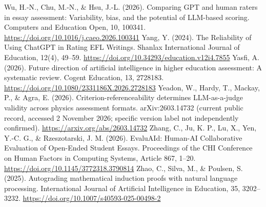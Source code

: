  Wu, H.-N., Chu, M.-N., \& Hsu, J.-L. (2026). Comparing GPT and human raters in essay assessment: Variability, bias, and the potential of LLM-based scoring. Computers and Education Open, 10, 100341. \url{https://doi.org/10.1016/j.caeo.2026.100341}
 Yang, Y. (2024). The Reliability of Using ChatGPT in Rating EFL Writings. Shanlax International Journal of Education, 12(4), 49--59. \url{https://doi.org/10.34293/education.v12i4.7855}
 Yasfi, A. (2026). Future direction of artificial intelligence in higher education assessment: A systematic review. Cogent Education, 13, 2728183. \url{https://doi.org/10.1080/2331186X.2026.2728183}
 Yeadon, W., Hardy, T., Mackay, P., \& Agra, E. (2026). Criterion-referenceability determines LLM-as-a-judge validity across physics assessment formats. arXiv:2603.14732 (current public record, accessed 2 November 2026; specific version label not independently confirmed). \url{https://arxiv.org/abs/2603.14732}
 Zhang, C., Ju, K. P., Lu, X., Yen, Y.-C. G., \& Rzeszotarski, J. M. (2026). EvaluAId: Human-AI Collaborative Evaluation of Open-Ended Student Essays. Proceedings of the CHI Conference on Human Factors in Computing Systems, Article 867, 1--20. \url{https://doi.org/10.1145/3772318.3790814}
 Zhao, C., Silva, M., \& Poulsen, S. (2025). Autograding mathematical induction proofs with natural language processing. International Journal of Artificial Intelligence in Education, 35, 3202--3232. \url{https://doi.org/10.1007/s40593-025-00498-2}
